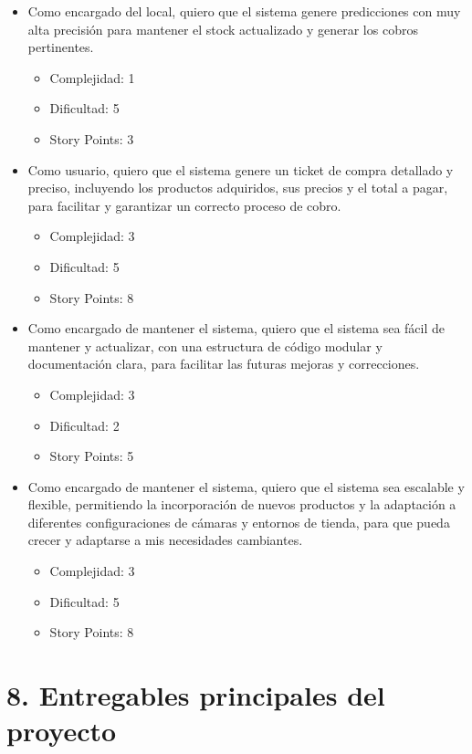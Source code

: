 \documentclass[
11pt, %
codirector, %
]{charter}
\begin{document}
\begin{itemize}
	\item Como encargado del local, quiero que el sistema genere predicciones con muy alta precisión para mantener el stock actualizado y generar los cobros pertinentes.
	\begin{itemize}
	\item Complejidad: 1
	\item Dificultad: 5
	\item Story Points: 3
	\end{itemize}
	\item Como usuario, quiero que el sistema genere un ticket de compra detallado y preciso, incluyendo los productos adquiridos, sus precios y el total a pagar, para facilitar y garantizar un correcto proceso de cobro.
	\begin{itemize}
	\item Complejidad: 3
	\item Dificultad: 5
	\item Story Points: 8
	\end{itemize}
	\item Como encargado de mantener el sistema, quiero que el sistema sea fácil de mantener y actualizar, con una estructura de código modular y documentación clara, para facilitar las futuras mejoras y correcciones.
	\begin{itemize}
	\item Complejidad: 3
	\item Dificultad: 2
	\item Story Points: 5
	\end{itemize}
	\item Como encargado de mantener el sistema, quiero que el sistema sea escalable y flexible, permitiendo la incorporación de nuevos productos y la adaptación a diferentes configuraciones de cámaras y entornos de tienda, para que pueda crecer y adaptarse a mis necesidades cambiantes.
	\begin{itemize}
	\item Complejidad: 3
	\item Dificultad: 5
	\item Story Points: 8
	\end{itemize}
\end{itemize}

\section{8. Entregables principales del proyecto}
\label{sec:entregables}
\end{document}
